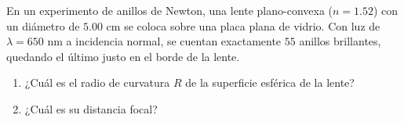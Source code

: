 \item En un experimento de anillos de Newton, una lente plano-convexa ($n = 1.52$) con un diámetro de $5.00\text{ cm}$ se coloca sobre una placa plana de vidrio. Con luz de $\lambda = 650\text{ nm}$ a incidencia normal, se cuentan exactamente $55$ anillos brillantes, quedando el último justo en el borde de la lente.
\begin{enumerate}
    \item ¿Cuál es el radio de curvatura $R$ de la superficie esférica de la lente?
    \item ¿Cuál es su distancia focal?
\end{enumerate}
